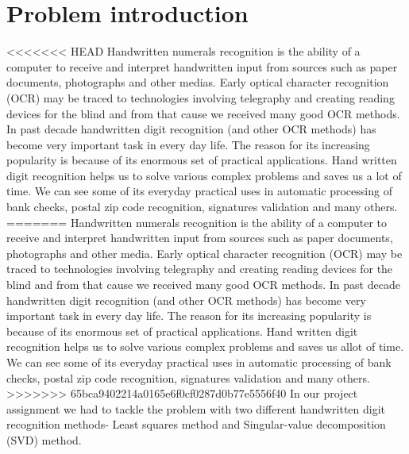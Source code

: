 \documentclass[12pt]{article}
\begin{document}
\section{Problem introduction}
<<<<<<< HEAD
Handwritten numerals recognition  is the ability of a computer to receive and interpret handwritten input from sources such as paper documents, photographs and other medias. Early optical character recognition (OCR) may be traced to technologies involving telegraphy and creating reading devices for the blind and from that cause we received many good OCR methods. In past decade handwritten digit recognition (and other OCR methods) has become very important task in every day life. The reason for its increasing popularity is because of its enormous set of practical applications. Hand written digit recognition helps us to solve various complex problems and saves us a lot of time. We can see some of its everyday practical uses in automatic processing of bank checks, postal zip code recognition, signatures validation and many others.\\
=======
Handwritten numerals recognition  is the ability of a computer to receive and interpret handwritten input from sources such as paper documents, photographs and other media. Early optical character recognition (OCR) may be traced to technologies involving telegraphy and creating reading devices for the blind and from that cause we received many good OCR methods. In past decade handwritten digit recognition (and other OCR methods) has become very important task in every day life. The reason for its increasing popularity is because of its enormous set of practical applications. Hand written digit recognition helps us to solve various complex problems and saves us allot of time. We can see some of its everyday practical uses in automatic processing of bank checks, postal zip code recognition, signatures validation and many others.\\
>>>>>>> 65bca9402214a0165e6f0cf0287d0b77e5556f40
\newline
In our project assignment we had to tackle the problem with two different handwritten digit recognition methods- Least squares method and Singular-value decomposition (SVD) method.

\newpage
\end{document}
